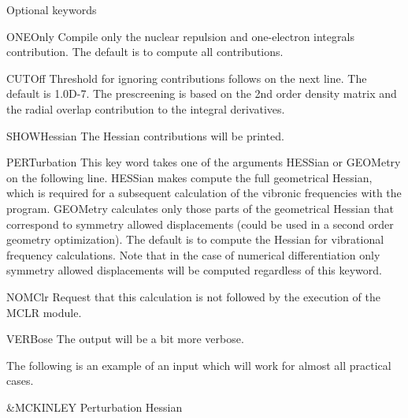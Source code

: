 Optional keywords
\begin{keywordlist}
\item[ONEOnly]
Compile only the nuclear repulsion and one-electron integrals
contribution. The default is to compute all contributions.
\item[CUTOff]
Threshold for ignoring contributions
follows on the next line. The default is 1.0D-{}7. The prescreening
is based on the 2nd order density matrix and the radial
overlap contribution to the integral derivatives.
\item[SHOWHessian]
The Hessian contributions will be printed.
\item[PERTurbation]
This key word takes one of the arguments HESSian or GEOMetry on the following line.
HESSian makes  compute the full geometrical Hessian, which is
required for a subsequent calculation of the vibronic frequencies with the  program.
GEOMetry calculates only those parts of the geometrical Hessian that correspond to symmetry
allowed displacements (could be used in a second order geometry optimization).
The default is to compute the Hessian for vibrational frequency calculations.
Note that in the case of numerical differentiation only symmetry allowed displacements
will be computed regardless of this keyword.
\item[NOMClr]
Request that this calculation is not followed by the execution of the MCLR module.
\item[VERBose]
The output will be a bit more verbose.
\end{keywordlist}

The following is an example of an input which will work for
almost all practical cases.

\begin{inputlisting}
 &MCKINLEY
Perturbation
Hessian
\end{inputlisting}
